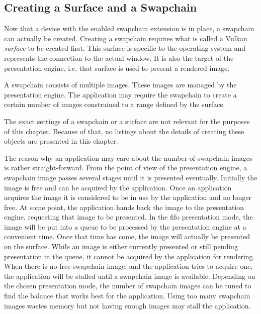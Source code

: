     \subsection{Creating a Surface and a Swapchain}
      Now that a device with the enabled swapchain extension is in place, a swapchain can actually be created.
      Creating a swapchain requires what is called a Vulkan \textit{surface} to be created first.
      This surface is specific to the operating system and represents the connection to the actual window.
      It is also the target of the presentation engine, i.e. that surface is used to present a rendered image.

      A swapchain consists of multiple images.
      These images are managed by the presentation engine.
      The application may require the swapchain to create a certain number of images constrained to a range defined by the surface.

      The exact settings of a swapchain or a surface are not relevant for the purposes of this chapter.
      Because of that, no listings about the details of creating these objects are presented in this chapter.

      The reason why an application may care about the number of swapchain images is rather straight-forward.
      From the point of view of the presentation engine, a swapchain image passes several stages until it is presented eventually.
      Initially the image is free and can be acquired by the application.
      Once an application acquires the image it is considered to be in use by the application and no longer free.
      At some point, the application hands back the image to the presentation engine, requesting that image to be presented.
      In the \gls{fifo} presentation mode, the image will be put into a queue to be processed by the presentation engine at a convenient time.
      Once that time has come, the image will actually be presented on the surface.
      While an image is either currently presented or still pending presentation in the queue, it cannot be acquired by the application for rendering.
      When there is no free swapchain image, and the application tries to acquire one, the application will be stalled until a swapchain image is available.
      Depending on the chosen presentation mode, the number of swapchain images can be tuned to find the balance that works best for the application.
      Using too many swapchain images wastes memory but not having enough images may stall the application.

